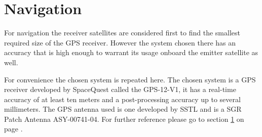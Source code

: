 \section{Navigation}
\label{NaviReceiver}

For navigation the receiver satellites are considered first to find the smallest required size of the \acs{GPS} receiver. However the system chosen there has an accuracy that is high enough to warrant its usage onboard the emitter satellite as well.

For convenience the chosen system is repeated here. The chosen system is a \acs{GPS} receiver developed by SpaceQuest called the GPS-12-V1, it has a real-time accuracy of at least ten meters and a post-processing accuracy up to several millimeters. The \acs{GPS} antenna used is one developed by \ac{SSTL} and is a SGR Patch Antenna ASY-00741-04. For further reference please go to section \ref{NaviReceiver} on page \pageref{NaviReceiver}.